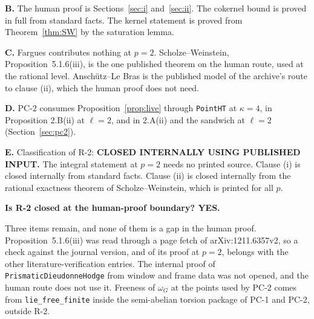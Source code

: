 \documentclass[11pt]{article}
\newcommand{\lean}[1]{\nolinkurl{#1}}
\theoremstyle{definition}
\theoremstyle{remark}
\begin{document}
\textbf{B.} The human proof is Sections~\ref{sec:i} and~\ref{sec:ii}. The cokernel bound is proved in full from standard facts. The kernel statement is proved from Theorem~\ref{thm:SW} by the saturation lemma.

\textbf{C.} Fargues contributes nothing at $p=2$. Scholze--Weinstein, Proposition~5.1.6(iii), is the one published theorem on the human route, used at the rational level. Anschütz--Le Bras is the published model of the archive's route to clause (ii), which the human proof does not need.

\textbf{D.} PC-2 consumes Proposition~\ref{prop:live} through \lean{PointHT} at $\kappa=4$, in Proposition 2.B(ii) at $\ell=2$, and in 2.A(ii) and the sandwich at $\ell=2$ (Section~\ref{sec:pc2}).

\textbf{E.} Classification of R-2: \textbf{CLOSED INTERNALLY USING PUBLISHED INPUT.} The integral statement at $p=2$ needs no printed source. Clause (i) is closed internally from standard facts. Clause (ii) is closed internally from the rational exactness theorem of Scholze--Weinstein, which is printed for all $p$.

\medskip
\textbf{Is R-2 closed at the human-proof boundary? YES.}
\medskip

Three items remain, and none of them is a gap in the human proof. Proposition~5.1.6(iii) was read through a page fetch of arXiv:1211.6357v2, so a check against the journal version, and of its proof at $p=2$, belongs with the other literature-verification entries. The internal proof of \lean{PrismaticDieudonneHodge} from window and frame data was not opened, and the human route does not use it. Freeness of $\omega_G$ at the points used by PC-2 comes from \lean{lie_free_finite} inside the semi-abelian torsion package of PC-1 and PC-2, outside R-2.
\end{document}
